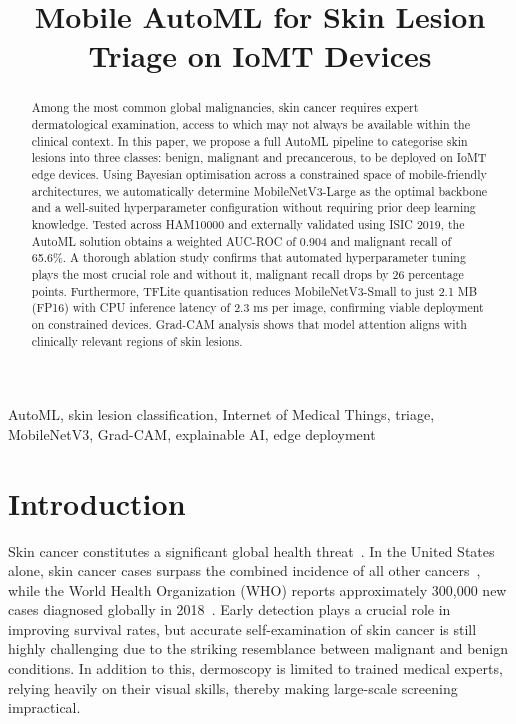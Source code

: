 \documentclass[conference]{IEEEtran}
\begin{document}
\title{Mobile AutoML for Skin Lesion Triage on IoMT Devices}

\author{
}

\maketitle

\begin{abstract}
Among the most common global malignancies, skin cancer requires expert dermatological examination, access to which may not always be available within the clinical context. In this paper, we propose a full AutoML pipeline to categorise skin lesions into three classes: benign, malignant and precancerous, to be deployed on IoMT edge devices. Using Bayesian optimisation across a constrained space of mobile-friendly architectures, we automatically determine MobileNetV3-Large as the optimal backbone and a well-suited hyperparameter configuration without requiring prior deep learning knowledge. Tested across HAM10000 and externally validated using ISIC 2019, the AutoML solution obtains a weighted AUC-ROC of 0.904 and malignant recall of 65.6\%. A thorough ablation study confirms that automated hyperparameter tuning plays the most crucial role and without it, malignant recall drops by 26 percentage points. Furthermore, TFLite quantisation reduces MobileNetV3-Small to just 2.1 MB (FP16) with CPU inference latency of 2.3 ms per image, confirming viable deployment on constrained devices. Grad-CAM analysis shows that model attention aligns with clinically relevant regions of skin lesions.
\end{abstract}

\begin{IEEEkeywords}
AutoML, skin lesion classification, Internet of Medical Things, triage, MobileNetV3, Grad-CAM, explainable AI, edge deployment
\end{IEEEkeywords}

\section{Introduction}
 
Skin cancer constitutes a significant global health threat~\cite{b1}. In the United States alone, skin cancer cases surpass the combined incidence of all other cancers~\cite{b2}, while the World Health Organization (WHO) reports approximately 300,000 new cases diagnosed globally in 2018~\cite{b3}. Early detection plays a crucial role in improving survival rates, but accurate self-examination of skin cancer is still highly challenging due to the striking resemblance between malignant and benign conditions. In addition to this, dermoscopy is limited to trained medical experts, relying heavily on their visual skills, thereby making large-scale screening impractical.
 
\end{document}

